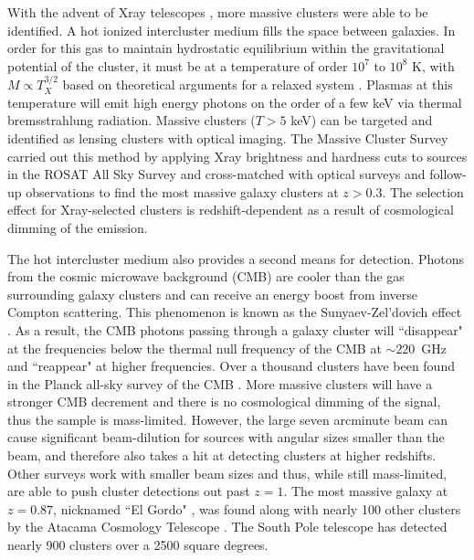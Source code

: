 With the advent of Xray telescopes \citep{Giacconi:1968ly}, more massive clusters were able to be identified. A hot ionized intercluster medium fills the space between galaxies. In order for this gas to maintain hydrostatic equilibrium within the gravitational potential of the cluster, it must be at a temperature of order $10^7$ to $10^8$ K, with $M\propto T_X^{3/2}$ based on theoretical arguments for a relaxed system \citep{Horner:1999rz}. Plasmas at this temperature will emit high energy photons on the order of a few keV via thermal bremsstrahlung radiation. Massive clusters ($T>5$ keV) can be targeted and identified as lensing clusters with optical imaging. The Massive Cluster Survey \citep[MACS; ][]{Ebeling:2001rt} carried out this method by applying Xray brightness and hardness cuts to sources in the ROSAT All Sky Survey and cross-matched with optical surveys and follow-up observations to find the most massive galaxy clusters at $z>0.3$. The selection effect for Xray-selected clusters is redshift-dependent as a result of cosmological dimming of the emission.

The hot intercluster medium also provides a second means for detection. Photons from the cosmic microwave background (CMB) are cooler than the gas surrounding galaxy clusters and can receive an energy boost from inverse Compton scattering. This phenomenon is known as the Sunyaev-Zel'dovich effect \citep{Sunyaev:1972lr}. As a result, the CMB photons passing through a galaxy cluster will ``disappear" at the frequencies below the thermal null frequency of the CMB at $\sim220$~GHz and ``reappear" at higher frequencies. Over a thousand clusters have been found in the Planck all-sky survey of the CMB \citep{Planck-Collaboration:2014gf}. More massive clusters will have a stronger CMB decrement and there is no cosmological dimming of the signal, thus the sample is mass-limited. However, the large seven arcminute beam can cause significant beam-dilution for sources with angular sizes smaller than the beam, and therefore also takes a hit at detecting clusters at higher redshifts. Other surveys work with smaller beam sizes and thus, while still mass-limited, are able to push cluster detections out past $z=1$. The most massive galaxy at $z=0.87$, nicknamed ``El Gordo" \citep{Menanteau:2012ul, Menanteau:2010fu}, was found along with nearly 100 other clusters by the Atacama Cosmology Telescope \citep[ACT; ][]{Hasselfield:2013pd,Marriage:2011qf}. The South Pole telescope \citep[SPT; ][]{Bleem:2015gf} has detected nearly 900 clusters over a 2500 square degrees. 

